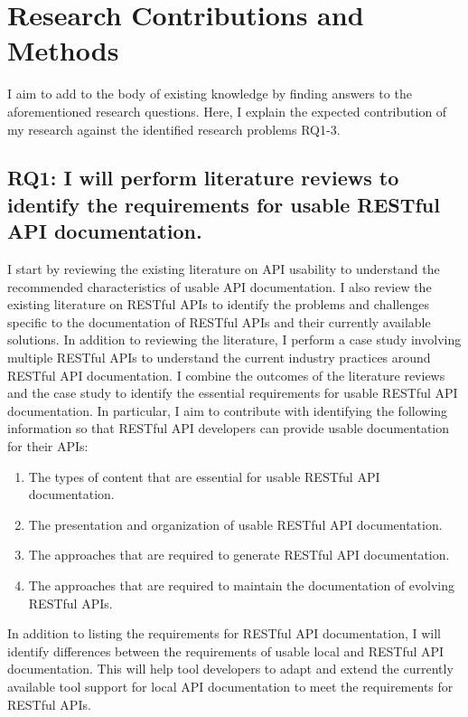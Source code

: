 \documentclass[11pt,oneside]{book}
\begin{document}
\section{Research Contributions and Methods}

I aim to add to the body of existing knowledge by finding answers to the aforementioned research questions. Here, I explain the expected contribution of my research against the identified research problems RQ1-3.

\subsection{RQ1: I will perform literature reviews to identify the requirements for usable RESTful API documentation.}

I start by reviewing the existing literature on API usability to understand the recommended characteristics of usable API documentation. I also review the existing literature on RESTful APIs to identify the problems and challenges specific to the documentation of RESTful APIs and their currently available solutions. In addition to reviewing the literature, I perform a case study involving multiple RESTful APIs to understand the current industry practices around RESTful API documentation. I combine the outcomes of the literature reviews and the case study to identify the essential requirements for usable RESTful API documentation. In particular, I aim to contribute with identifying the following information so that RESTful API developers can provide usable documentation for their APIs:

\begin{enumerate}
\item The types of content that are essential for usable RESTful API documentation.
\item The presentation and organization of usable RESTful API documentation.
\item The approaches that are required to generate RESTful API documentation.
\item The approaches that are required to maintain the documentation of evolving RESTful APIs.
\end{enumerate}

In addition to listing the requirements for RESTful API documentation, I will identify differences between the requirements of usable local and RESTful API documentation. This will help tool developers to adapt and extend the currently available tool support for local API documentation to meet the requirements for RESTful APIs.
\end{document}
